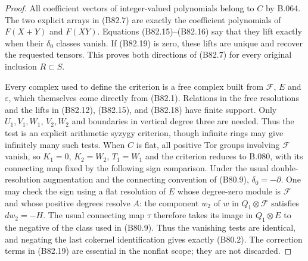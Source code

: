 \begin{proof}
All coefficient vectors of integer-valued polynomials belong to
$C$ by B.064. The two explicit arrays in (B82.7) are exactly the
coefficient polynomials of $F(X+Y)$ and $F(XY)$.
Equations (B82.15)--(B82.16) say that they lift exactly when their
$\delta_0$ classes vanish. If (B82.19) is zero, these lifts are
unique and recover the requested tensors. This proves both
directions of (B82.7) for every original inclusion $R\subset S$.

Every complex used to define the criterion is a free complex built
from $\mathcal F$, $E$ and $\varepsilon$, which themselves come
directly from (B82.1). Relations in the free resolutions and the
lifts in (B82.12), (B82.15), and (B82.18) have finite support.
Only $U_1,V_1,W_1$, $V_2,W_2$ and boundaries in vertical degree
three are needed. Thus the test is an explicit arithmetic syzygy
criterion, though infinite rings may give infinitely many such
tests. When $C$ is flat, all positive Tor groups involving
$\mathcal F$ vanish, so $K_1=0$, $K_2=W_2$, $T_1=W_1$ and the
criterion reduces to B.080, with its connecting map fixed by the
following sign comparison. Under the usual double-resolution
augmentation and the connecting convention of (B80.9),
$\delta_0=-\partial$. One may check the sign using a flat resolution
of $E$ whose degree-zero module is $\mathcal F$ and whose positive
degrees resolve $A$: the component $w_2$ of $w$ in
$Q_1\otimes\mathcal F$ satisfies $dw_2=-H$. The usual connecting
map $\tau$ therefore takes its image in $Q_1\otimes E$ to the
negative of the class used in (B80.9). Thus the vanishing tests
are identical, and negating the last cokernel identification gives
exactly (B80.2). The correction terms in (B82.19) are essential
in the nonflat scope; they are not discarded.


\end{proof}
